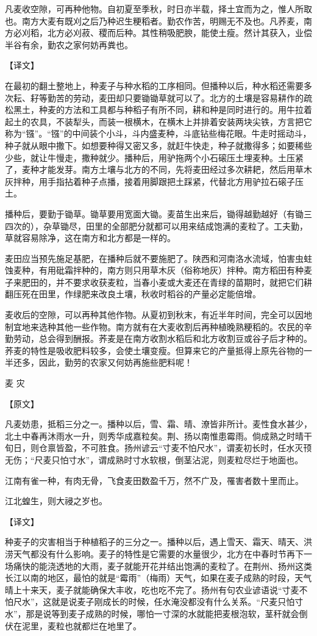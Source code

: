 \documentclass[12pt,UTF8]{ctexbook}
\begin{document}
凡麦收空隙，可再种他物。自初夏至季秋，时日亦半载，择土宜而为之，惟人所取也。南方大麦有既刈之后乃种迟生粳稻者。勤农作苦，明赐无不及也。凡荞麦，南方必刈稻，北方必刈菽、稷而后种。其性稍吸肥腴，能使土瘦。然计其获入，业偿半谷有余，勤农之家何妨再粪也。

【译文】

在最初的翻土整地上，种麦子与种水稻的工序相同。但播种以后，种水稻还需要多次耘、耔等勤苦的劳动，麦田却只要锄锄草就可以了。北方的土壤是容易耕作的疏松黑土，种麦的方法和工具都与种稻子有所不同，耕和种是同时进行的。用牛拉着起土的农具，不装犁头，而装一根横木，在横木上并排着安装两块尖铁，方言把它称为“镪”。“镪”的中间装个小斗，斗内盛麦种，斗底钻些梅花眼。牛走时摇动斗，种子就从眼中撒下。如想要种得又密又多，就赶牛快走，种子就撒得多；如要稀些少些，就让牛慢走，撒种就少。播种后，用驴拖两个小石磙压土埋麦种。土压紧了，麦种才能发芽。南方土壤与北方的不同，先将麦田经过多次耕耙，然后用草木灰拌种，用手指拈着种子点播，接着用脚跟把土踩紧，代替北方用驴拉石磙子压土。

播种后，要勤于锄草。锄草要用宽面大锄。麦苗生出来后，锄得越勤越好（有锄三四次的），杂草锄尽，田里的全部肥分就都可以用来结成饱满的麦粒了。工夫勤，草就容易除净，这在南方和北方都是一样的。

麦田应当预先施足基肥，在播种后就不要施肥了。陕西和河南洛水流域，怕害虫蛀蚀麦种，有用砒霜拌种的，南方则只用草木灰（俗称地灰）拌种。南方稻田有种麦子来肥田的，并不要求收获麦粒，当春小麦或大麦还在青绿的苗期时，就把它们耕翻压死在田里，作绿肥来改良土壤，秋收时稻谷的产量必定能倍增。

麦收后的空隙，可以再种其他作物。从夏初到秋末，有近半年时间，完全可以因地制宜地来选种其他一些作物。南方就有在大麦收割后再种植晚熟粳稻的。农民的辛勤劳动，总会得到酬报。荞麦是在南方收割水稻后和北方收割豆或谷子后才种的。荞麦的特性是吸收肥料较多，会使土壤变瘦。但算来它的产量抵得上原先谷物的一半还多，因此，勤劳的农家又何妨再施些肥料呢！

麦 灾

【原文】

凡麦妨患，抵稻三分之一。播种以后，雪、霜、晴、潦皆非所计。麦性食水甚少，北土中春再沐雨水一升，则秀华成嘉粒矣。荆、扬以南惟患霉雨。倘成熟之时晴干旬日，则仓禀皆盈，不可胜食。扬州谚云“寸麦不怕尺水”，谓麦初长时，任水灭顸无伤；“尺麦只怕寸水”，谓成熟时寸水软根，倒茎沾泥，则麦粒尽烂于地面也。

江南有雀一种，有肉无骨，飞食麦田数盈千万，然不广及，罹害者数十里而止。

江北蝗生，则大祲之岁也。

【译文】

种麦子的灾害相当于种植稻子的三分之一。播种以后，遇上雪天、霜天、晴天、洪涝天气都没有什么影响。麦子的特性是它需要的水量很少，北方在中春时节再下一场痛快的能浇透地的大雨，麦子就能开花并结出饱满的麦粒了。在荆州、扬州这类长江以南的地区，最怕的就是“霉雨”（梅雨）天气，如果在麦子成熟的时段，天气晴上十来天，麦子就能确保大丰收，吃也吃不完了。扬州有句农业谚语说“寸麦不怕尺水”，这就是说麦子刚成长的时候，任水淹没都没有什么关系。“尺麦只怕寸水”，那是说等到麦子成熟的时候，哪怕一寸深的水就能把麦根泡软，茎秆就会倒伏在泥里，麦粒也就都烂在地里了。
\end{document}
